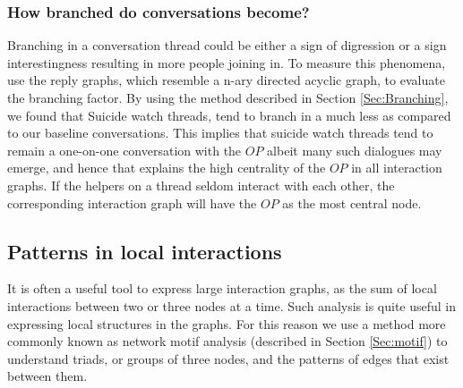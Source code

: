 \subsubsection{How branched do conversations become?}
Branching in a conversation thread could be either a sign of digression or a sign interestingness resulting in more people joining in. To measure this phenomena, use the reply graphs, which resemble a n-ary directed acyclic graph, to evaluate the branching factor. By using the method described in Section \ref{Sec:Branching}, we found that Suicide watch threads, tend to branch in a much less as compared to our baseline conversations. This implies that suicide watch threads tend to remain a one-on-one conversation with the $OP$ albeit many such dialogues may emerge, and hence that explains the high centrality of the $OP$ in all interaction graphs. If the helpers on a thread seldom interact with each other, the corresponding interaction graph will have the $OP$ as the most central node.


\subsection{Patterns in local interactions}
It is often a useful tool to express large interaction graphs, as the sum of local interactions between two or three nodes at a time. Such analysis is quite useful in expressing local structures in the graphs. 
For this reason we use a method more commonly known as network motif analysis (described in Section \ref{Sec:motif}) to understand triads, or groups of three nodes, and the patterns of edges that exist between them. 

